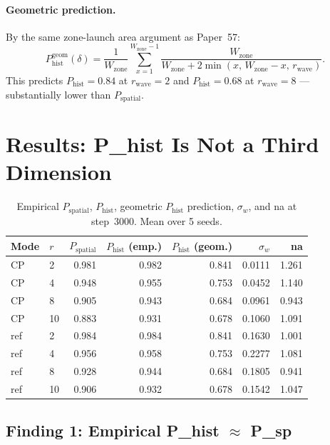 \documentclass[11pt,a4paper]{article}
\newcommand{\sw}{\sigma_w}
\newcommand{\Psp}{P_{\mathrm{spatial}}}
\newcommand{\Phist}{P_{\mathrm{hist}}}
\begin{document}
\paragraph{Geometric prediction.}
By the same zone-launch area argument as Paper~57:
\begin{equation}
  \Phist^\mathrm{geom}(\delta) = \frac{1}{W_\mathrm{zone}}
  \sum_{x=1}^{W_\mathrm{zone}-1}
  \frac{W_\mathrm{zone}}{W_\mathrm{zone} + 2\min(x,\,W_\mathrm{zone}-x,\,r_\mathrm{wave})}.
\end{equation}
This predicts $\Phist = 0.84$ at $r_\mathrm{wave}=2$ and $\Phist=0.68$ at $r_\mathrm{wave}=8$
--- substantially lower than $\Psp$.

\section{Results: P\_hist Is Not a Third Dimension}

\begin{table}[h]
\centering
\caption{Empirical $\Psp$, $\Phist$, geometric $\Phist$ prediction, $\sw$, and na at step~3000.
Mean over 5 seeds.}
\label{tab:main}
\begin{tabular}{llrrrrr}
\toprule
Mode & $r$ & $\Psp$ & $\Phist$ (emp.) & $\Phist$ (geom.) & $\sw$ & na \\
\midrule
CP  & 2  & 0.981 & 0.982 & 0.841 & 0.0111 & 1.261 \\
CP  & 4  & 0.948 & 0.955 & 0.753 & 0.0452 & 1.140 \\
CP  & 8  & 0.905 & 0.943 & 0.684 & 0.0961 & 0.943 \\
CP  & 10 & 0.883 & 0.931 & 0.678 & 0.1060 & 1.091 \\
\midrule
ref & 2  & 0.984 & 0.984 & 0.841 & 0.1630 & 1.001 \\
ref & 4  & 0.956 & 0.958 & 0.753 & 0.2277 & 1.081 \\
ref & 8  & 0.928 & 0.944 & 0.684 & 0.1805 & 0.941 \\
ref & 10 & 0.906 & 0.932 & 0.678 & 0.1542 & 1.047 \\
\bottomrule
\end{tabular}
\end{table}

\subsection{Finding 1: Empirical P\_hist $\approx$ P\_sp}
\end{document}
